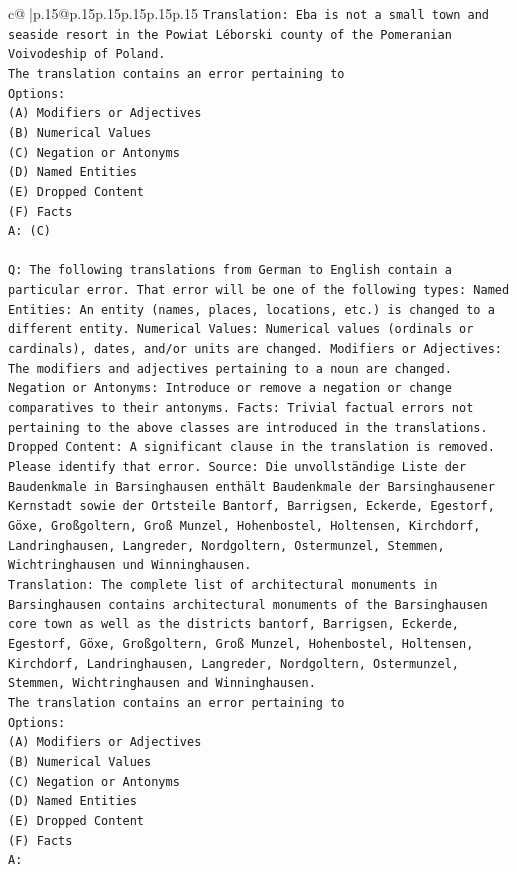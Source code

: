 \documentclass{article}
\begin{document}
{\begin{supertabular}{c@{$\;$}|p{.15\linewidth}@{}p{.15\linewidth}p{.15\linewidth}p{.15\linewidth}p{.15\linewidth}p{.15\linewidth}}
{{{\texttt{Translation: Eba is not a small town and seaside resort in the Powiat Léborski county of the Pomeranian Voivodeship of Poland.} \\
\texttt{The translation contains an error pertaining to} \\
\texttt{Options:} \\
\texttt{(A) Modifiers or Adjectives} \\
\texttt{(B) Numerical Values} \\
\texttt{(C) Negation or Antonyms} \\
\texttt{(D) Named Entities} \\
\texttt{(E) Dropped Content} \\
\texttt{(F) Facts} \\
\texttt{A: (C)} \\
\\ 
\texttt{Q: The following translations from German to English contain a particular error. That error will be one of the following types: Named Entities: An entity (names, places, locations, etc.) is changed to a different entity. Numerical Values: Numerical values (ordinals or cardinals), dates, and/or units are changed. Modifiers or Adjectives: The modifiers and adjectives pertaining to a noun are changed. Negation or Antonyms: Introduce or remove a negation or change comparatives to their antonyms. Facts: Trivial factual errors not pertaining to the above classes are introduced in the translations. Dropped Content: A significant clause in the translation is removed. Please identify that error.  Source: Die unvollständige Liste der Baudenkmale in Barsinghausen enthält Baudenkmale der Barsinghausener Kernstadt sowie der Ortsteile Bantorf, Barrigsen, Eckerde, Egestorf, Göxe, Großgoltern, Groß Munzel, Hohenbostel, Holtensen, Kirchdorf, Landringhausen, Langreder, Nordgoltern, Ostermunzel, Stemmen, Wichtringhausen und Winninghausen.} \\
\texttt{Translation: The complete list of architectural monuments in Barsinghausen contains architectural monuments of the Barsinghausen core town as well as the districts bantorf, Barrigsen, Eckerde, Egestorf, Göxe, Großgoltern, Groß Munzel, Hohenbostel, Holtensen, Kirchdorf, Landringhausen, Langreder, Nordgoltern, Ostermunzel, Stemmen, Wichtringhausen and Winninghausen.} \\
\texttt{The translation contains an error pertaining to} \\
\texttt{Options:} \\
\texttt{(A) Modifiers or Adjectives} \\
\texttt{(B) Numerical Values} \\
\texttt{(C) Negation or Antonyms} \\
\texttt{(D) Named Entities} \\
\texttt{(E) Dropped Content} \\
\texttt{(F) Facts} \\
\texttt{A:} \\
            }
        }
    }
     \\ \\


\end{supertabular}}
\end{document}

